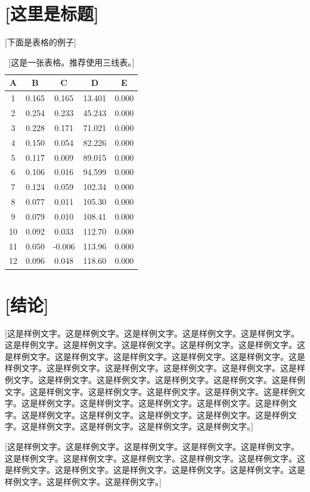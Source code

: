 \documentclass[a4paper,11pt,onecolumn,twoside]{article}
\begin{document}
\section{[这里是标题]}
[下面是表格的例子]
\begin{table}[H]
  \centering
  \begin{tabular}{ccccc}
    \midrule[1.5pt]
    A & B & C & D & E \\
    \hline
    1 & 0.165 & 0.165 & 13.401 & 0.000 \\
    2 & 0.254 & 0.233 & 45.243 & 0.000 \\
    3 & 0.228 & 0.171 & 71.021 & 0.000 \\
    4 & 0.150 & 0.054 & 82.226 & 0.000 \\
    5 & 0.117 & 0.009 & 89.015 & 0.000 \\
    6 & 0.106 & 0.016 & 94.599 & 0.000 \\
    7 & 0.124 & 0.059 & 102.34 & 0.000 \\
    8 & 0.077 & 0.011 & 105.30 & 0.000 \\
    9 & 0.079 & 0.010 & 108.41 & 0.000 \\
    10 & 0.092 & 0.033 & 112.70 & 0.000 \\
    11 & 0.050 & -0.006 & 113.96 & 0.000 \\
    12 & 0.096 & 0.048 & 118.60 & 0.000 \\
    \midrule[1.5pt]
  \end{tabular}
  \caption{[这是一张表格。推荐使用三线表。]}
\end{table}

\section{[结论]}
[这是样例文字。这是样例文字。这是样例文字。这是样例文字。这是样例文字。这是样例文字。这是样例文字。这是样例文字。这是样例文字。这是样例文字。这是样例文字。这是样例文字。这是样例文字。这是样例文字。这是样例文字。这是样例文字。这是样例文字。这是样例文字。这是样例文字。这是样例文字。这是样例文字。这是样例文字。这是样例文字。这是样例文字。这是样例文字。这是样例文字。这是样例文字。这是样例文字。这是样例文字。这是样例文字。这是样例文字。这是样例文字。这是样例文字。这是样例文字。这是样例文字。这是样例文字。这是样例文字。这是样例文字。这是样例文字。这是样例文字。这是样例文字。这是样例文字。这是样例文字。这是样例文字。这是样例文字。]

[这是样例文字。这是样例文字。这是样例文字。这是样例文字。这是样例文字。这是样例文字。这是样例文字。这是样例文字。这是样例文字。这是样例文字。这是样例文字。这是样例文字。这是样例文字。这是样例文字。这是样例文字。这是样例文字。这是样例文字。这是样例文字。]
					
\end{document}
